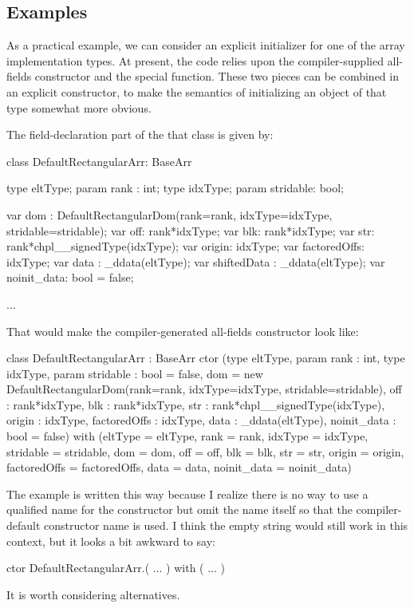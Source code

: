 \subsection{Examples}

As a practical example, we can consider an explicit initializer for one of the array
implementation types.  At present, the code relies upon the compiler-supplied all-fields
constructor and the special  function.  These two pieces can be combined in an
explicit constructor, to make the semantics of initializing an object of that type
somewhat more obvious.

The field-declaration part of the that class is given by:
\begin{chapel}
  class DefaultRectangularArr: BaseArr {
    type eltType;
    param rank : int;
    type idxType;
    param stridable: bool;
  
    var dom : DefaultRectangularDom(rank=rank, idxType=idxType,
                                           stridable=stridable);
    var off: rank*idxType;
    var blk: rank*idxType;
    var str: rank*chpl__signedType(idxType);
    var origin: idxType;
    var factoredOffs: idxType;
    var data : _ddata(eltType);
    var shiftedData : _ddata(eltType);
    var noinit_data: bool = false;

    ...
  }
\end{chapel}
That would make the compiler-generated all-fields constructor look like:
\begin{chapel}
class DefaultRectangularArr : BaseArr {
  ctor (type eltType,
        param rank : int,
        type idxType,
        param stridable : bool = false,
        dom = new DefaultRectangularDom(rank=rank, idxType=idxType,
                                         stridable=stridable),
        off : rank*idxType,
        blk : rank*idxType,
        str : rank*chpl__signedType(idxType),
        origin : idxType,
        factoredOffs : idxType,
        data : _ddata(eltType),
        noinit_data : bool = false)
    with (eltType = eltType,
          rank = rank,
          idxType = idxType,
          stridable = stridable,
          dom = dom,
          off = off,
          blk = blk,
          str = str,
          origin = origin,
          factoredOffs = factoredOffs,
          data = data,
          noinit_data = noinit_data) {}
}
\end{chapel}

\begin{openissue}
The example is written this way because I realize there is no way to use a qualified name
for the constructor but omit the name itself so that the compiler-default constructor name
is used.  I think the empty string would still work in this context, but it looks a bit
awkward to say:
\begin{chapel}
ctor DefaultRectangularArr.( ... ) with ( ... ) {}
\end{chapel}
It is worth considering alternatives.
\end{openissue}


